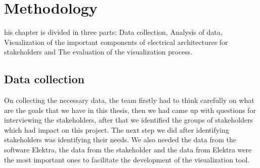 \chapter{Methodology}
\lettrine[findent=2pt]{}{ }his chapter is divided in three parts: Data collection, Analysis of data, Visualization of the important components of electrical architectures for stakeholders and The evaluation of the visualization process.
%
\section{Data collection}
On collecting the necessary data, the team firstly had to think carefully on what are the goals that we have in this thesis, then we had came up with questions for interviewing the stakeholders, after that we identified the groups of stakeholders which had impact on this project. The next step we did after identifying stakeholders was identifying their needs. We also needed the data from the software Elektra, the data from the stakeholder and the data from Elektra were the most important ones to facilitate the development of the visualization tool.


